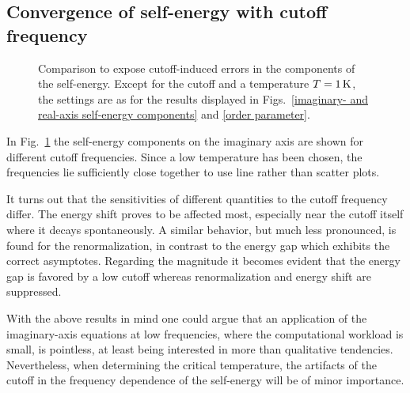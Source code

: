 \subsection{Convergence of self-energy with cutoff frequency}

\begin{figure}
    \small
    \begin{minipage}{4.666cm}
        
    \end{minipage}%
    \begin{minipage}{4.666cm}
        
    \end{minipage}%
    \begin{minipage}{4.666cm}
        
    \end{minipage}%
    \caption[Cutoff-induced errors of self-energy]{
        Comparison to expose cutoff-induced errors in the components of the
        self-energy. Except for the cutoff and a temperature $T = 1 \, \mathrm K$,
        the settings are as for the results displayed in Figs.~\ref{imaginary-
        and real-axis self-energy components} and \ref{order parameter}.}
    \label{cutoff dependence of the self-energy}
\end{figure}
%
In Fig.~\ref{cutoff dependence of the self-energy} the self-energy components
on the imaginary axis are shown for different cutoff frequencies. Since a low
temperature has been chosen, the  frequencies lie sufficiently
close together to use line rather than scatter plots.

It turns out that the sensitivities of different quantities to the cutoff
frequency differ. The energy shift proves to be affected most, especially near
the cutoff itself where it decays spontaneously. A similar behavior, but much
less pronounced, is found for the renormalization, in contrast to the energy gap
which exhibits the correct asymptotes. Regarding the magnitude it becomes
evident that the energy gap is favored by a low cutoff whereas renormalization
and energy shift are suppressed.

With the above results in mind one could argue that an application of the
imaginary-axis  equations at low frequencies, where the
computational workload is small, is pointless, at least being interested in more
than qualitative tendencies. Nevertheless, when determining the critical
temperature, the artifacts of the cutoff in the frequency dependence of the
self-energy will be of minor importance.

